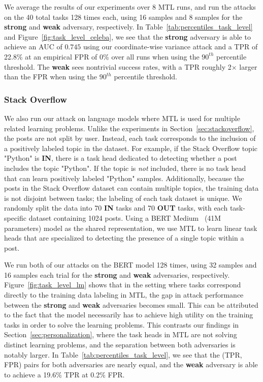 We average the results of our experiments over 8 MTL runs, and run the attacks on the 40 total tasks 128 times each, using 16 samples and 8 samples for the \textbf{strong} and \textbf{weak} adversary, respectively. In Table~\ref{tab:percentiles_task_level} and Figure~\ref{fig:task_level_celeba}, we see that the \textbf{strong} adversary is able to achieve an AUC of $0.745$ using our coordinate-wise variance attack and a TPR of 22.8\% at an empirical FPR of 0\% over all runs when using the $90^{th}$ percentile threshold. The \textbf{weak} sees nontrivial success rates, with a TPR roughly 2$\times$ larger than the FPR when using the $90^{th}$ percentile threshold. 





\subsubsection{Stack Overflow} \label{sec:stack_overflow_task_level}


We also run our attack on language models where MTL is used for multiple related learning problems. Unlike the experiments in Section~\ref{sec:stackoverflow}, the posts are not split by user. Instead, each task corresponds to the inclusion of a positively labeled topic in the dataset. For example, if the Stack Overflow topic "Python" is \textbf{IN}, there is a task head dedicated to detecting whether a post includes the topic "Python". If the topic is \emph{not} included, there is no task head that can learn positively labeled "Python" samples. Additionally, because the posts in the Stack Overflow dataset can contain multiple topics, the training data is not disjoint between tasks; the labeling of each task dataset is unique. We randomly split the data into 70 \textbf{IN} tasks and 70 \textbf{OUT} tasks, with each task-specific dataset containing 1024 posts. Using a BERT Medium~\cite{bertsmall_1} (41M parameters) model as the shared representation, we use MTL to learn linear task heads that are specialized to detecting the presence of a single topic within a post.

We run both of our attacks on the BERT model 128 times, using 32 samples and 16 samples each trial for the \textbf{strong} and \textbf{weak} adversaries, respectively. Figure~\ref{fig:task_level_lm} shows that in the setting where tasks correspond directly to the training data labeling in MTL, the gap in attack performance between the \textbf{strong} and \textbf{weak} adversaries becomes small. This can be attributed to the fact that the model necessarily has to achieve high utility on the training tasks in order to solve the learning problems. This contrasts our findings in Section~\ref{sec:personalization}, where the task heads in MTL are not solving distinct learning problems, and the separation between both adversaries is notably larger. In Table~\ref{tab:percentiles_task_level}, we see that the (TPR, FPR) pairs for both adversaries are nearly equal, and the \textbf{weak} adversary is able to achieve a 19.6\% TPR at 0.2\% FPR. 

